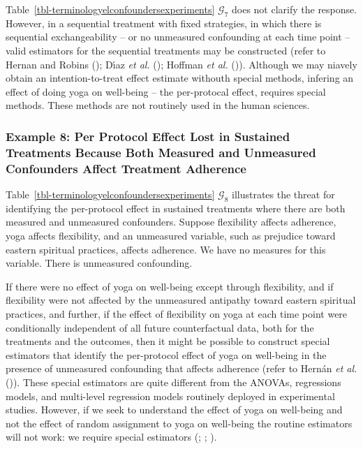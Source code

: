 \documentclass[
  single column]{article}
\begin{document}
Table~\ref{tbl-terminologyelconfoundersexperiments} \(\mathcal{G}_{7}\)
does not clarify the response. However, in a sequential treatment with
fixed strategies, in which there is sequential exchangeability -- or no
unmeasured confounding at each time point -- valid estimators for the
sequential treatments may be constructed (refer to Hernan and Robins
(); Dı́az \emph{et al.}
(); Hoffman \emph{et al.}
()). Although we may niavely obtain an
intention-to-treat effect estimate withouth special methods, infering an
effect of doing yoga on well-being -- the per-protocal effect, requires
special methods. These methods are not routinely used in the human
sciences.

\subsubsection{Example 8: Per Protocol Effect Lost in Sustained
Treatments Because Both Measured and Unmeasured Confounders Affect
Treatment
Adherence}\label{example-8-per-protocol-effect-lost-in-sustained-treatments-because-both-measured-and-unmeasured-confounders-affect-treatment-adherence}

Table~\ref{tbl-terminologyelconfoundersexperiments} \(\mathcal{G}_{8}\)
illustrates the threat for identifying the per-protocol effect in
sustained treatments where there are both measured and unmeasured
confounders. Suppose flexibility affects adherence, yoga affects
flexibility, and an unmeasured variable, such as prejudice toward
eastern spiritual practices, affects adherence. We have no measures for
this variable. There is unmeasured confounding.

If there were no effect of yoga on well-being except through
flexibility, and if flexibility were not affected by the unmeasured
antipathy toward eastern spiritual practices, and further, if the effect
of flexibility on yoga at each time point were conditionally independent
of all future counterfactual data, both for the treatments and the
outcomes, then it might be possible to construct special estimators that
identify the per-protocol effect of yoga on well-being in the presence
of unmeasured confounding that affects adherence (refer to Hernán
\emph{et al.} ()). These special
estimators are quite different from the ANOVAs, regressions models, and
multi-level regression models routinely deployed in experimental
studies. However, if we seek to understand the effect of yoga on
well-being and not the effect of random assignment to yoga on well-being
the routine estimators will not work: we require special estimators
(;
;
).
\end{document}
